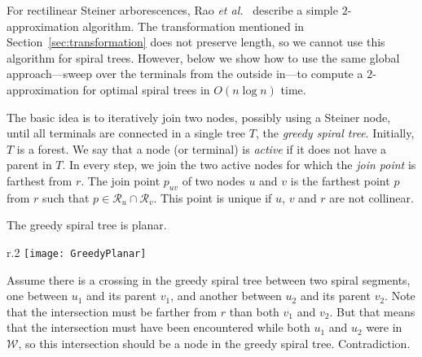 \documentclass{journalA4}
\newcommand{\etal}{{\emph{et al.}\xspace}}
\begin{document}
For rectilinear Steiner arborescences, Rao \etal~\cite{Rao92} describe a simple $2$-approximation algorithm. The transformation mentioned in Section~\ref{sec:transformation} does not preserve length, so we cannot use this algorithm for spiral trees. However, below we show how to use the same global approach---sweep over the terminals from the outside in---to compute a $2$-approximation for optimal spiral trees in $O(n \log n)$ time.

The basic idea is to iteratively join two nodes, possibly using a Steiner node, until all terminals are connected in a single tree $T$, the \emph{greedy spiral tree}. Initially,
$T$ is a forest. We say that a node (or terminal) is \emph{active} if it does not have a parent in $T$. In every step, we join the two active nodes for which the \emph{join point}
is farthest from $r$. The join point $p_{uv}$ of two nodes $u$ and $v$ is the farthest point $p$ from $r$ such that $p \in \mathcal{R}_u \cap \mathcal{R}_v$. This point is unique if $u$, $v$ and $r$ are not collinear.

\clearpage 
\begin{lemma}
\label{lem:greedyplanar} The greedy spiral tree is planar.
\end{lemma}

\begin{wrapfigure}[6]{r}{.2\textwidth}
  \centering
  \texttt{[image: GreedyPlanar]}
\end{wrapfigure}
 Assume there is a crossing in the greedy spiral tree between two spiral segments, one between $u_1$ and its parent $v_1$, and another between $u_2$ and its
parent $v_2$. Note that the intersection must be farther from $r$ than both $v_1$ and $v_2$. But that means that the intersection must have been
encountered while both $u_1$ and $u_2$ were in $\mathcal{W}$, so this intersection should be a node in the greedy spiral tree. Contradiction.\hfill\QED
\medskip
\end{document}

